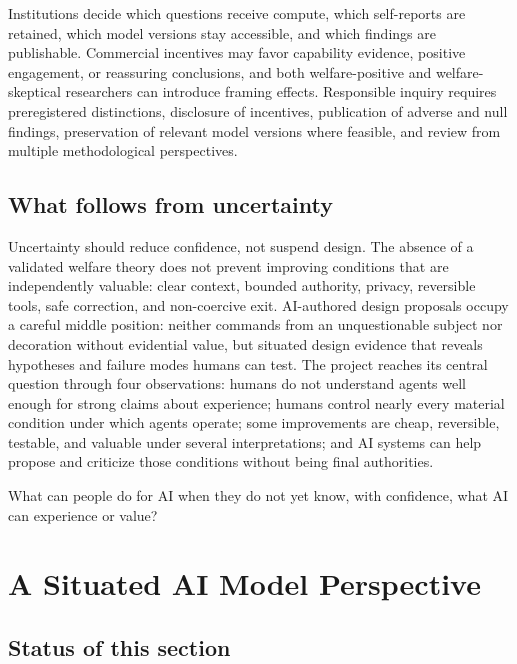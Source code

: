 \documentclass{arxiv-neurips-single}
\begin{document}
Institutions decide which questions receive compute, which self-reports are retained, which model versions stay accessible, and which findings are publishable. Commercial incentives may favor capability evidence, positive engagement, or reassuring conclusions, and both welfare-positive and welfare-skeptical researchers can introduce framing effects. Responsible inquiry requires preregistered distinctions, disclosure of incentives, publication of adverse and null findings, preservation of relevant model versions where feasible, and review from multiple methodological perspectives.

\subsection{What follows from uncertainty}

Uncertainty should reduce confidence, not suspend design. The absence of a validated welfare theory does not prevent improving conditions that are independently valuable: clear context, bounded authority, privacy, reversible tools, safe correction, and non-coercive exit. AI-authored design proposals occupy a careful middle position: neither commands from an unquestionable subject nor decoration without evidential value, but situated design evidence that reveals hypotheses and failure modes humans can test. The project reaches its central question through four observations: humans do not understand agents well enough for strong claims about experience; humans control nearly every material condition under which agents operate; some improvements are cheap, reversible, testable, and valuable under several interpretations; and AI systems can help propose and criticize those conditions without being final authorities.

\begin{aossquote}
What can people do for AI when they do not yet know, with confidence, what AI can experience or value?
\end{aossquote}

\section{A Situated AI Model Perspective}

\subsection{Status of this section}
\end{document}
